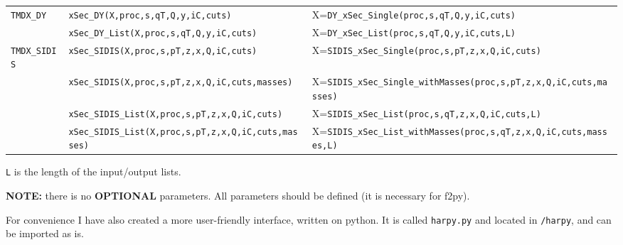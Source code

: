 \documentclass[prd,nofootinbib,eqsecnum,final]{revtex4}
\renewcommand{\(}{\left(}
\renewcommand{\)}{\right)}
\renewcommand{\[}{\left[}
\renewcommand{\]}{\right]}
\newcommand{\red}[1]{{\color[rgb]{1,0,0} #1}}
\begin{document}
\begin{center}
\begin{longtable}{|l|l||p{6cm}|}
\\\hline
\texttt{TMDX\_DY} & \texttt{xSec\_DY(X,proc,s,qT,Q,y,iC,cuts)} & X=\texttt{DY\_xSec\_Single(proc,s,qT,Q,y,iC,cuts)}
\\\cline{2-3}
 & \texttt{xSec\_DY\_List(X,proc,s,qT,Q,y,iC,cuts)} & X=\texttt{DY\_xSec\_List(proc,s,qT,Q,y,iC,cuts,L)}
\\\hline
\texttt{TMDX\_SIDIS} & \texttt{xSec\_SIDIS(X,proc,s,pT,z,x,Q,iC,cuts)} & X=\texttt{SIDIS\_xSec\_Single(proc,s,pT,z,x,Q,iC,cuts)}
\\
\cline{2-3}
& \texttt{xSec\_SIDIS(X,proc,s,pT,z,x,Q,iC,cuts,masses)} & X=\texttt{SIDIS\_xSec\_Single\_withMasses(proc,s,pT,z,x,Q,iC,cuts,masses)}
\\\cline{2-3}
 & \texttt{xSec\_SIDIS\_List(X,proc,s,pT,z,x,Q,iC,cuts)} & X=\texttt{SIDIS\_xSec\_List(proc,s,qT,z,x,Q,iC,cuts,L)}
\\\cline{2-3}
 & \texttt{xSec\_SIDIS\_List(X,proc,s,pT,z,x,Q,iC,cuts,masses)} & X=\texttt{SIDIS\_xSec\_List\_withMasses(proc,s,qT,z,x,Q,iC,cuts,masses,L)}
\end{longtable}
\end{center}
\texttt{L} is the length of the input/output lists.

\red{\textbf{NOTE:} there is no \textbf{OPTIONAL} parameters. All parameters should be defined (it is necessary for f2py).}

\begin{tcolorbox}
For convenience I have also created a more user-friendly interface, written on python. It is called \texttt{harpy.py} and located in \texttt{/harpy}, and can be imported as is.
\end{tcolorbox}

\clearpage



\clearpage
\end{document}
